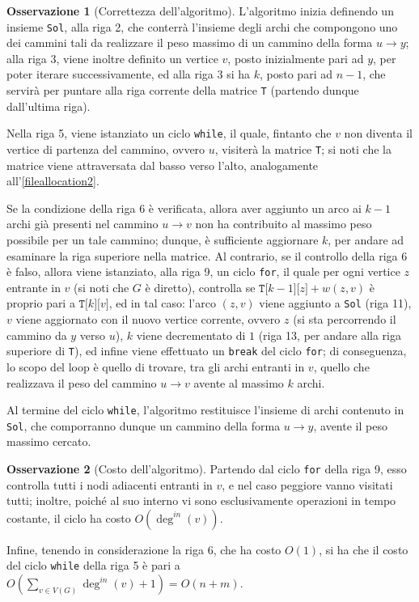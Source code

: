 \documentclass[14pt]{extreport}
\theoremstyle{definition}
\theoremstyle{definition}
\newtheorem{remark}{Osservazione}[subsection]
\begin{document}
\begin{remark}[Correttezza dell'algoritmo]
    L'algoritmo inizia definendo un insieme \texttt{Sol}, alla riga 2, che conterrà l'insieme degli archi che compongono uno dei cammini tali da realizzare il peso massimo di un cammino della forma $u \rightarrow y$; alla riga 3, viene inoltre definito un vertice $v$, posto inizialmente pari ad $y$, per poter iterare successivamente, ed alla riga 3 si ha $k$, posto pari ad $n - 1$, che servirà per puntare alla riga corrente della matrice \texttt{T} (partendo dunque dall'ultima riga).

    Nella riga 5, viene istanziato un ciclo \texttt{while}, il quale, fintanto che $v$ non diventa il vertice di partenza del cammino, ovvero $u$, visiterà la matrice \texttt{T}; si noti che la matrice viene attraversata dal basso verso l'alto, analogamente all'\cref{fileallocation2}.

    Se la condizione della riga 6 è verificata, allora aver aggiunto un arco ai $k - 1$ archi già presenti nel cammino $u \rightarrow v$ non ha contribuito al massimo peso possibile per un tale cammino; dunque, è sufficiente aggiornare $k$, per andare ad esaminare la riga superiore nella matrice. Al contrario, se il controllo della riga 6 è falso, allora viene istanziato, alla riga 9, un ciclo \texttt{for}, il quale per ogni vertice $z$ entrante in $v$ (si noti che $G$ è diretto), controlla se $\texttt{T[}k - 1\texttt{][}z\texttt{]} + w(z, v)$ è proprio pari a $\texttt{T[}k\texttt{][}v\texttt{]}$, ed in tal caso: l'arco $(z, v)$ viene aggiunto a \texttt{Sol} (riga 11), $v$ viene aggiornato con il nuovo vertice corrente, ovvero $z$ (si sta percorrendo il cammino da $y$ verso $u$), $k$ viene decrementato di $1$ (riga 13, per andare alla riga superiore di \texttt{T}), ed infine viene effettuato un \texttt{break} del ciclo \texttt{for}; di conseguenza, lo scopo del loop è quello di trovare, tra gli archi entranti in $v$, quello che realizzava il peso del cammino $u \rightarrow v$ avente al massimo $k$ archi.

    Al termine del ciclo \texttt{while}, l'algoritmo restituisce l'insieme di archi contenuto in \texttt{Sol}, che comporranno dunque un cammino della forma $u \rightarrow y$, avente il peso massimo cercato.
\end{remark}

\begin{remark}[Costo dell'algoritmo]
    Partendo dal ciclo \texttt{for} della riga 9, esso controlla tutti i nodi adiacenti entranti in $v$, e nel caso peggiore vanno visitati tutti; inoltre, poiché al suo interno vi sono esclusivamente operazioni in tempo costante, il ciclo ha costo $O(\deg^{in}(v))$.

    Infine, tenendo in considerazione la riga 6, che ha costo $O(1)$, si ha che il costo del ciclo \texttt{while} della riga 5 è pari a $\displaystyle O\left(\sum_{v \in V(G)}{\deg^{in}(v) + 1} \right) = O(n + m)$.
\end{remark}
\end{document}
